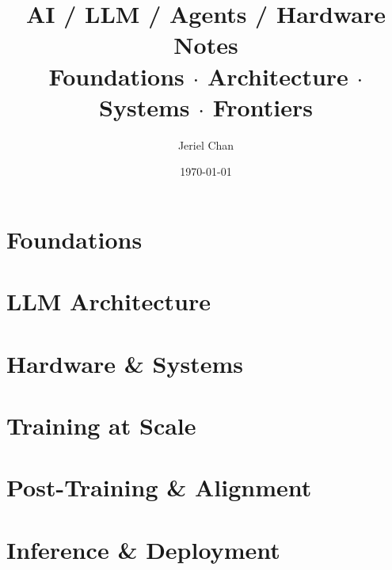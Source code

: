 \documentclass[11pt,a4paper]{article}
\title{\textbf{AI / LLM / Agents / Hardware Notes}\\[0.5em]
       \Large Foundations $\cdot$ Architecture $\cdot$ Systems $\cdot$ Frontiers}
\author{Jeriel Chan}
\date{\today}
\begin{document}
\maketitle
\tableofcontents
\newpage

\part{Foundations}






\part{LLM Architecture}








\part{Hardware \& Systems}







\part{Training at Scale}



\part{Post-Training \& Alignment}




\part{Inference \& Deployment}







\end{document}
